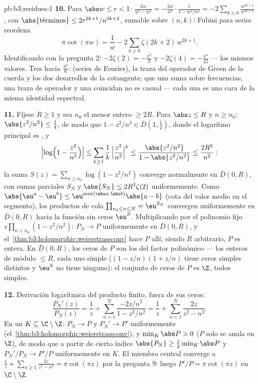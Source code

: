 \begin{solution}{pb:b3:residues:1}
\textbf{10.} Para $\abs w \leq r < 1$: $\frac{2w}{w^2 - n^2} =
-\frac{2w}{n^2}\cdot\frac1{1 - w^2/n^2} =
-2\sum_{k\geq0}\frac{w^{2k+1}}{n^{2k+2}}$, con
$\abs{\text{términos}} \leq 2r^{2k+1}/n^{2k+2}$, sumable sobre $(n, k)$:
Fubini para series reordena
\[
\pi\cot(\pi w) = \frac1w -
2\sum_{k\geq0}\zeta(2k+2)\,w^{2k+1} .
\]
Identificando con la pregunta 2: $-2\zeta(2) = -\frac{\pi^2}3$ y
$-2\zeta(4) = -\frac{\pi^4}{45}$ --- los mismos valores. Tres 
hacia $\frac{\pi^2}6$: 
(series de Fourier), la traza del operador de Green de la cuerda y los
dos desarrollos de la cotangente; que una suma sobre frecuencias, una
traza de operador y una  coincidan no es casual --- cada una es una cara de la misma
identidad espectral.

\textbf{11.} Fíjese $R \geq 1$ y sea $n_0$ el menor entero $\geq 2R$.
Para $\abs z \leq R$ y $n \geq n_0$: $\abs{z^2/n^2} \leq \frac14$, de
modo que $1 - z^2/n^2 \in
\bar D(1, \frac14)$, donde el logaritmo principal es
, y
\[
\Bigl|\log\Bigl(1 - \frac{z^2}{n^2}\Bigr)\Bigr|
\leq \sum_{k\geq1}\frac1k\,\Bigl|\frac{z^2}{n^2}\Bigr|^k
\leq \frac{\abs{z^2/n^2}}{1 - \abs{z^2/n^2}}
\leq \frac{2R^2}{n^2} :
\]
la suma $S(z) = \sum_{n\geq n_0}\log(1 - z^2/n^2)$ converge normalmente
en $\bar D(0, R)$, con sumas parciales
 $S_N$ y
$\abs{S_N} \leq 2R^2\zeta(2)$ uniformemente. Como
$\abs{\eu^a - \eu^b} \leq
\eu^{\max(\abs a,\abs b)}\abs{a - b}$ (cota del valor medio en el
segmento), los productos de cola $\prod_{n_0\leq n\leq N} =
\eu^{S_N}$ convergen uniformemente en $\bar D(0, R)$ hacia la función
sin ceros $\eu^S$. Multiplicando por el polinomio fijo
$z\prod_{n<n_0}(1 - z^2/n^2)$: $P_N \to P$ uniformemente en
$\bar D(0, R)$, y el~\cref{thm:b3:holomorphic:weierstrassconv} hace $P$
 allí; siendo $R$ arbitrario,
$P$ es entera. En $\bar D(0, R)$, los ceros de $P$ son los del factor
polinómico --- los enteros de módulo $\leq R$, cada uno simple
($(1 - z/n)(1 + z/n)$ tiene ceros simples distintos y $\eu^S$ no tiene
ninguno): el conjunto de ceros de $P$ es $\Z$, todos simples.

\textbf{12.} Derivación logarítmica del producto finito, fuera de sus
ceros:
\[
\frac{P_N'(z)}{P_N(z)} = \frac1z +
\sum_{n=1}^{N}\frac{-2z/n^2}{1 - z^2/n^2}
= \frac1z + \sum_{n=1}^{N}\frac{2z}{z^2 - n^2} .
\]
En un 
$K \subseteq \C\setminus\Z$: $P_N \to P$ y $P_N' \to P'$ uniformemente
(el~\cref{thm:b3:holomorphic:weierstrassconv}), y $\min_K
\abs P > 0$ ($P$ solo se anula en $\Z$), de modo que a partir de cierto
índice $\abs{P_N} \geq \frac12\min_K\abs P$ y $P_N'/P_N \to
P'/P$ uniformemente en $K$. El miembro central converge a
$\frac1z + \sum_{n\geq1}\frac{2z}{z^2-n^2} = \pi\cot(\pi z)$
por la pregunta 9: luego $P'/P = \pi\cot(\pi z)$ en
$\C\setminus\Z$.


\end{solution}
